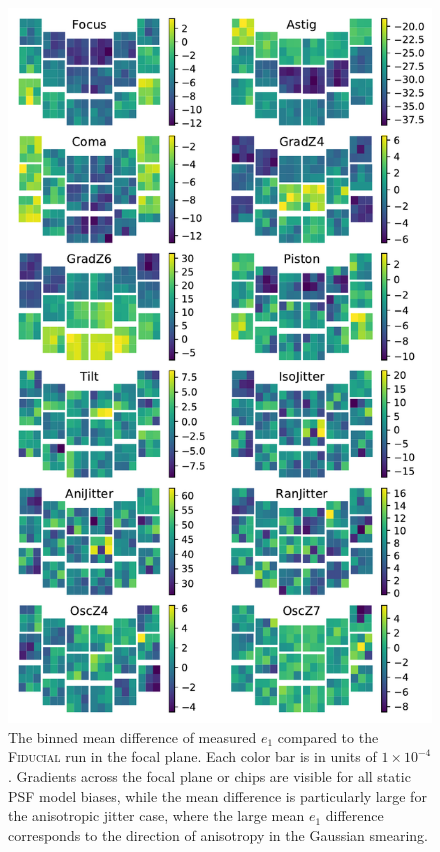 \documentclass[usenatbib]{mnras}
\begin{document}
\begin{figure}
\begin{center}
\includegraphics[width=\columnwidth]{figures/focal_mean_e1.pdf}
\end{center}
\caption[]{
The binned mean difference of measured $e_1$ compared to the \textsc{Fiducial} run in the focal plane. Each color bar is in units of $1\times 10^{-4}$. Gradients across the focal plane or chips are visible for all static PSF model biases, while the mean difference is particularly large for the anisotropic jitter case, where the large mean $e_1$ difference corresponds to the direction of anisotropy in the Gaussian smearing.
\label{fig:focal_mean_e1}}
\end{figure}
\end{document}
